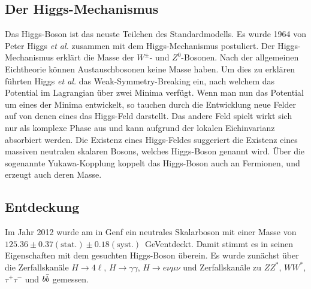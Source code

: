 \subsection{Der Higgs-Mechanismus}
Das Higgs-Boson ist das neuste Teilchen des Standardmodells. Es wurde 1964 von Peter Higgs \emph{et al.} zusammen mit dem Higgs-Mechanismus postuliert\cite{Higgs:1964pj}. Der Higgs-Mechanismus erklärt die Masse der $W^\pm$- und $Z^0$-Bosonen. Nach der allgemeinen Eichtheorie können Austauschbosonen keine Masse haben. Um dies zu erklären führten Higgs \emph{et al.} das Weak-Symmetry-Breaking ein, nach welchem das Potential im Lagrangian über zwei Minima verfügt. Wenn man nun das Potential um eines der Minima entwickelt, so tauchen durch die Entwicklung neue Felder auf von denen eines das Higgs-Feld darstellt\cite{halzen2008quark}. Das andere Feld spielt wirkt sich nur als komplexe Phase aus und kann aufgrund der lokalen Eichinvarianz absorbiert werden. Die Existenz eines Higgs-Feldes suggeriert die Existenz eines massiven neutralen skalaren Bosons, welches Higgs-Boson genannt wird.
Über die sogenannte Yukawa-Kopplung koppelt das Higgs-Boson auch an Fermionen, und erzeugt auch deren Masse.
\subsection{Entdeckung}
Im Jahr 2012 wurde am \lhc in Genf ein neutrales Skalarboson mit einer Masse von $125.36 \pm 0.37(\text{stat.}) \pm 0.18 (\text{syst.})$~GeVentdeckt. Damit stimmt es in seinen Eigenschaften mit dem gesuchten Higgs-Boson überein. Es wurde zunächst über die Zerfallskanäle $H \rightarrow 4 \ell$, $H \rightarrow \gamma\gamma$, $H \rightarrow e\nu\mu\nu$ und Zerfallskanäle zu $ZZ^*$, $WW^*$, $\tau^+\tau^-$ und $\mbox{$b\bar{b}$}$ gemessen.

